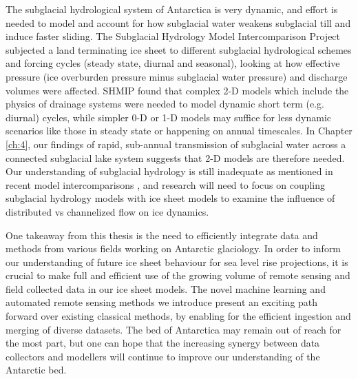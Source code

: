 
The subglacial hydrological system of Antarctica is very dynamic, and effort is needed to model and account for how subglacial water weakens subglacial till and induce faster sliding.
The Subglacial Hydrology Model Intercomparison Project \citep[SHMIP;][]{DeFleurianSHMIPsubglacialhydrology2018} subjected a land terminating ice sheet to different subglacial hydrological schemes and forcing cycles (steady state, diurnal and seasonal), looking at how effective pressure (ice overburden pressure minus subglacial water pressure) and discharge volumes were affected.
SHMIP found that complex 2-D models which include the physics of drainage systems were needed to model dynamic short term (e.g. diurnal) cycles, while simpler 0-D or 1-D models may suffice for less dynamic scenarios like those in steady state or happening on annual timescales.
In Chapter \ref{ch:4}, our findings of rapid, sub-annual transmission of subglacial water across a connected subglacial lake system suggests that 2-D models are therefore needed.
Our understanding of subglacial hydrology is still inadequate as mentioned in recent model intercomparisons \citep[ISMIP6; ][]{SeroussiISMIP6Antarcticamultimodel2020}, and research will need to focus on coupling subglacial hydrology models with ice sheet models \citep[e.g.][]{SommersSHAKTISubglacialHydrology2018,Smith-Johnsenrolesubglacialhydrology2020} to examine the influence of distributed vs channelized flow on ice dynamics.

One takeaway from this thesis is the need to efficiently integrate data and methods from various fields working on Antarctic glaciology.
In order to inform our understanding of future ice sheet behaviour for sea level rise projections, it is crucial to make full and efficient use of the growing volume of remote sensing and field collected data in our ice sheet models.
The novel machine learning and automated remote sensing methods we introduce present an exciting path forward over existing classical methods, by enabling for the efficient ingestion and merging of diverse datasets.
The bed of Antarctica may remain out of reach for the most part, but one can hope that the increasing synergy between data collectors and modellers will continue to improve our understanding of the Antarctic bed.

